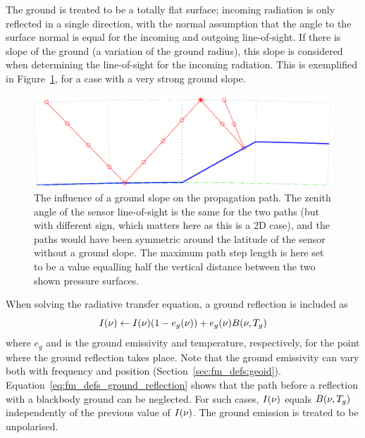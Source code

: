 \label{sec:fm_defs:groundrefl}

The ground is treated to be a totally flat surface; incoming radiation
is only reflected in a single direction, with the normal assumption
that the angle to the surface normal is equal for the incoming and
outgoing line-of-sight. If there is slope of the ground (a variation of the ground radius), this slope is considered
when determining the line-of-sight for the incoming radiation. This is
exemplified in Figure~\ref{fig:fm_defs:ppath_cases2}, for a case with
a very strong ground slope.

\begin{figure}[!t]
 \begin{center}
  \includegraphics*[width=0.95\hsize]{Figs/fm_definitions/ppath_cases2}
  \caption{The influence of a ground slope on the propagation path. The zenith
    angle of the sensor line-of-sight is the same for the two paths (but with
    different sign, which matters here as this is a 2D case), and the paths
    would have been symmetric around the latitude of the sensor without a 
    ground slope. The maximum path step length is here set to be a value
    equalling half the vertical distance between the two shown pressure
    surfaces.}
  \label{fig:fm_defs:ppath_cases2}
 \end{center}
\end{figure}

When solving the radiative transfer equation, a ground reflection is
included as
\begin{equation}
  I(\nu) \gets I(\nu)(1-e_g(\nu)) + e_g(\nu)B(\nu,T_{g})
  \label{eq:fm_defs_ground_reflection}
\end{equation}
where $e_g$ and  is the ground emissivity and temperature,
respectively, for the point where the ground reflection takes place.
Note that the ground emissivity can vary both with frequency and
position (Section~\ref{sec:fm_defs:geoid}).
Equation~\ref{eq:fm_defs_ground_reflection} shows that the path before
a reflection with a blackbody ground can be neglected. For such cases,
$I(\nu)$ equals $B(\nu,T_{g})$ independently of the previous
value of $I(\nu)$. The ground emission is treated to be
unpolarised.

